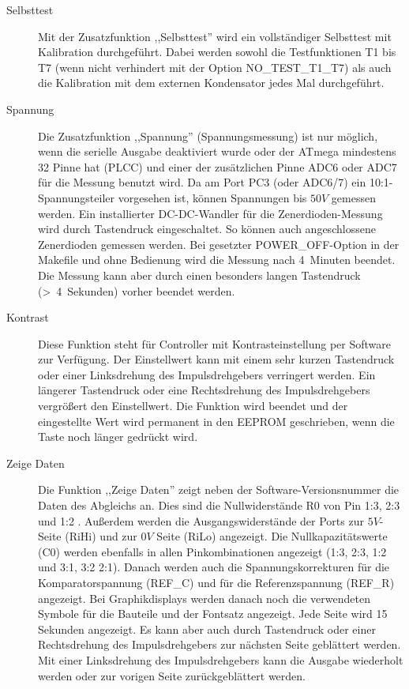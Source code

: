 \begin{description}
 \item[Selbsttest]
Mit der Zusatzfunktion ,,Selbsttest'' wird ein vollständiger Selbsttest mit Kalibration durchgeführt.
Dabei werden sowohl die Testfunktionen T1 bis T7 (wenn nicht verhindert mit der Option NO\_TEST\_T1\_T7) 
als auch die Kalibration mit dem externen Kondensator jedes Mal durchgeführt.\\

 \item[Spannung]
Die Zusatzfunktion ,,Spannung'' (Spannungsmessung) ist nur möglich, wenn die serielle Ausgabe deaktiviert wurde
oder der ATmega mindestens 32 Pinne hat (PLCC) und einer der zusätzlichen Pinne ADC6 oder ADC7 für die Messung benutzt wird.
Da am Port PC3 (oder ADC6/7) ein 10:1-Spannungsteiler vorgesehen ist, können Spannungen bis \(50V\) gemessen werden.
Ein installierter DC-DC-Wandler für die Zenerdioden-Messung wird durch Tastendruck eingeschaltet.
So können auch angeschlossene Zenerdioden gemessen werden.
Bei gesetzter POWER\_OFF-Option in der Makefile und ohne Bedienung wird die Messung nach 4~Minuten beendet.
Die Messung kann aber durch einen besonders langen Tastendruck (\textgreater~4~Sekunden) vorher beendet werden.\\

\item[Kontrast] 
Diese Funktion steht für Controller mit Kontrasteinstellung per Software zur Verfügung.
Der Einstellwert kann mit einem sehr kurzen Tastendruck oder einer Linksdrehung des Impulsdrehgebers verringert werden.
Ein längerer Tastendruck oder eine Rechtsdrehung des Impulsdrehgebers vergrößert den Einstellwert.
Die Funktion wird beendet und der eingestellte Wert wird permanent in den EEPROM geschrieben, 
wenn die Taste noch länger gedrückt wird.

 \item[Zeige Daten]
Die Funktion ,,Zeige Daten'' zeigt neben der Software-Versionsnummer die Daten des Abgleichs an.
Dies sind die Nullwiderstände R0 von Pin 1:3, 2:3 und 1:2 .
Außerdem werden die Ausgangswiderstände der Ports zur \(5V\)-Seite (RiHi) und 
zur \(0V\) Seite (RiLo) angezeigt.
Die Nullkapazitätswerte (C0) werden ebenfalls in allen Pinkombinationen angezeigt (1:3, 2:3, 1:2 und 3:1, 3:2 2:1).
Danach werden auch die Spannungskorrekturen für die Komparatorspannung (REF\_C) und für die Referenzspannung (REF\_R) angezeigt.
Bei Graphikdisplays werden danach noch die verwendeten Symbole für die Bauteile und der Fontsatz angezeigt.
Jede Seite wird 15 Sekunden angezeigt.
Es kann aber auch durch Tastendruck oder einer Rechtsdrehung des Impulsdrehgebers
zur nächsten Seite geblättert werden.
Mit einer Linksdrehung des Impulsdrehgebers kann die Ausgabe wiederholt werden oder zur vorigen Seite zurückgeblättert werden.


\end{description}
